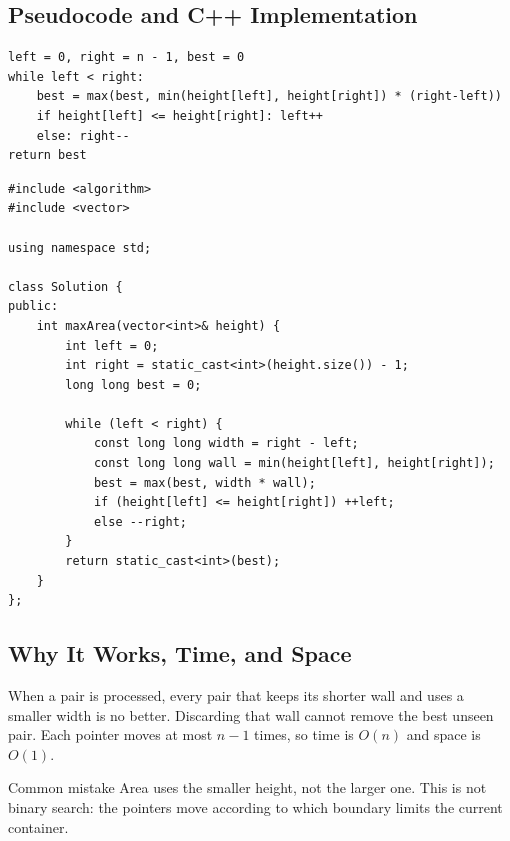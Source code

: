 \subsection{Pseudocode and C++ Implementation}
\begin{lstlisting}[style=pseudocode]
left = 0, right = n - 1, best = 0
while left < right:
    best = max(best, min(height[left], height[right]) * (right-left))
    if height[left] <= height[right]: left++
    else: right--
return best
\end{lstlisting}

\begin{lstlisting}[style=compactcode,caption={Complete C++ solution: Container With Most Water}]
#include <algorithm>
#include <vector>

using namespace std;

class Solution {
public:
    int maxArea(vector<int>& height) {
        int left = 0;
        int right = static_cast<int>(height.size()) - 1;
        long long best = 0;

        while (left < right) {
            const long long width = right - left;
            const long long wall = min(height[left], height[right]);
            best = max(best, width * wall);
            if (height[left] <= height[right]) ++left;
            else --right;
        }
        return static_cast<int>(best);
    }
};
\end{lstlisting}

\subsection{Why It Works, Time, and Space}
When a pair is processed, every pair that keeps its shorter wall and uses a
smaller width is no better. Discarding that wall cannot remove the best
unseen pair. Each pointer moves at most \(n-1\) times, so time is \(O(n)\) and
space is \(O(1)\).

\begin{revisionbox}{Common mistake}
Area uses the smaller height, not the larger one. This is not binary search:
the pointers move according to which boundary limits the current container.
\end{revisionbox}

